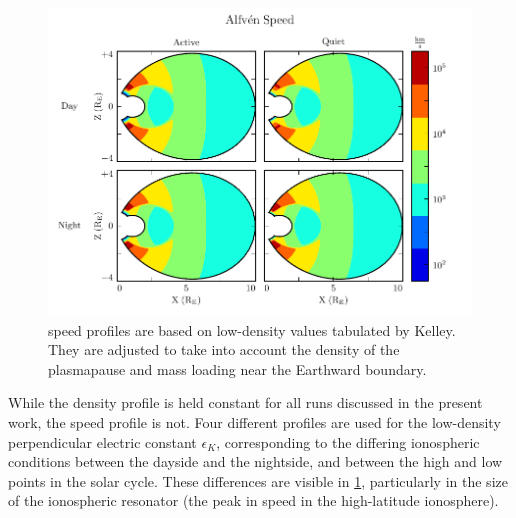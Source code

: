 \begin{figure}[!htb]
  \centering
  \includegraphics[width=\textwidth]{figures/va.pdf}
  \caption[\Alfven Speed Profiles]{
    \Alfven speed profiles are based on low-density values tabulated by
    Kelley\cite{kelley_1989}. They are adjusted to take into account the
    density of the plasmapause and mass loading near the Earthward boundary. 
  }
  \label{fig_va}
\end{figure}

While the density profile is held constant for all runs discussed in the
present work, the \Alfven speed profile is not. Four different profiles are
used for the low-density perpendicular electric constant $\epsilon_K$,
corresponding to the differing ionospheric conditions between the dayside and
the nightside, and between the high and low points in the solar cycle. These
differences are visible in \cref{fig_va}, particularly in the size of the
ionospheric \Alfven resonator (the peak in \Alfven speed in the high-latitude
ionosphere). 


